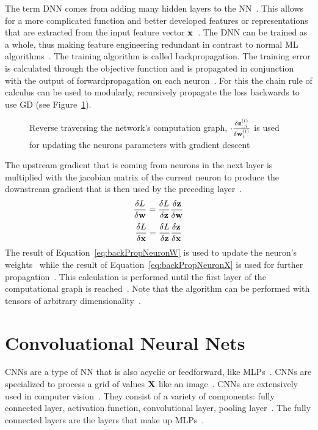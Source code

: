 The term \ac{DNN} comes from adding many hidden layers to the \ac{NN}~\citep{shrestha_review_2019}.
This allows for a more complicated function and better developed features or representations that
are extracted from the input feature vector $\textbf{x}$~\citep{oyedotun_deep_2015}.
The \ac{DNN} can be trained as a whole, thus making feature engineering redundant in contrast to
normal \ac{ML} algorithms~\citep{arpteg_software_2018}.
The training algorithm is called backpropagation.
The training error is calculated through the objective function and is propagated
in conjunction with the output of forwardpropagation on each neuron~\citep{goodfellow_deep_2016}.
For this the chain rule of calculus can be used to modularly, recursively propagate the
loss backwards to use \ac{GD} (see Figure~\ref{fig:error-backpropagation}).
\begin{figure}[ht]
	\centering
    
	\caption[Backpropagation of errors through the network.]{%
        Reverse traversing the network's computation graph,
        $\cdot \frac{\delta \textbf{z}_{:,i}^{(l)}}{\delta \textbf{w}_i^{(l)}}$ is used for
        updating the neurons parameters with gradient descent\label{fig:error-backpropagation}
    }
\end{figure}
The upstream gradient that is coming from neurons in the next layer is multiplied with the
jacobian matrix of the current neuron to produce the downstream gradient that is then used by
the preceding layer~\citep{boue_deep_2018,goodfellow_deep_2016}.
\begin{equation}\label{eq:backPropNeuronW}
    \frac{\delta L}{\delta\textbf{w}} = \frac{\delta L}{\delta\textbf{z}} \frac{\delta\textbf{z}}{\delta\textbf{w}}
\end{equation}
\begin{equation}\label{eq:backPropNeuronX}
    \frac{\delta L}{\delta\textbf{x}} = \frac{\delta L}{\delta\textbf{z}}\frac{\delta\textbf{z}}{\delta\textbf{x}}
\end{equation}
The result of Equation~\ref{eq:backPropNeuronW} is used to update the neuron's weights \w\ while
the result of Equation~\ref{eq:backPropNeuronX} is used for further
propagation~\citep{boue_deep_2018}.
This calculation is performed until the first layer of the computational graph is
reached~\citep{goodfellow_deep_2016}.
Note that the algorithm can be performed with tensors of arbitrary
dimensionality~\citep{goodfellow_deep_2016}.

\section{Convoluational Neural Nets}\label{se:cnn}
\acp{CNN} are a type of \ac{NN} that is also acyclic or feedforward, like
\acp{MLP}~\citep{chauhan_review_2018}.
\acp{CNN} are specialized to process a grid of values $\textbf{X}$ like an image~\citep{goodfellow_deep_2016}.
\acp{CNN} are extensively used in computer vision~\citep{chauhan_review_2018}.
They consist of a variety of components: fully connected layer, activation function,
convolutional layer, pooling layer~\citep{chauhan_review_2018,ponti_everything_2017}.
The fully connected layers are the layers that make up \acp{MLP}~\citep{ponti_everything_2017}.

